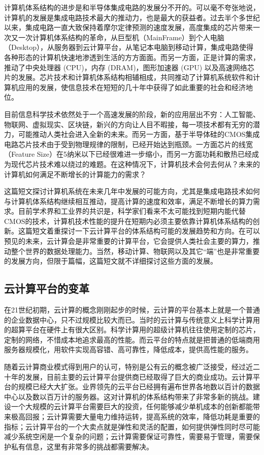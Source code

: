 计算机体系结构的进步是和半导体集成电路的发展分不开的。可以毫不夸张地说，计算机的发展是集成电路技术最大的推动力，也是最大的获益者。过去半个多世纪以来，集成电路一直大致保持着摩尔定律预测的速度发展，高度集成的芯片带来一次又一次计算机体系结构的革命，从巨型机（MainFrame）到个人电脑（Desktop），从服务器到云计算平台，从笔记本电脑到移动计算，集成电路使得各种形态的计算机快速地渗透到生活的方方面面。而另一方面，正是计算的需求，推动了中央处理器 (CPU)，内存 (DRAM)，图形加速器 (GPU) 以及高速网络芯片的发展。芯片技术和计算机体系结构相辅相成，共同推动了计算机系统软件和计算机应用的发展，使信息技术在短短的几十年中获得了如此重要的社会和经济地位。

目前信息科学技术依然处于一个高速发展的阶段，新的应用层出不穷：人工智能、物联网、虚拟现实、区块链，新兴的方向让人目不暇接，每一项技术都有无穷的潜力，可能推动人类社会进入全新的未来。而另一方面，基于半导体硅的CMOS集成电路芯片技术由于受到物理规律的限制，已经开始达到瓶颈。一方面芯片的线宽（Feature Size）在5纳米以下已经很难进一步缩小，而另一方面功耗和散热已经成为现代芯片技术难以绕过的难题。在这种情况下，计算机技术会何去何从？未来的计算机如何满足不断增长的计算能力的需求？

这篇短文探讨计算机系统在未来几年中发展的可能方向，尤其是集成电路技术如何与计算机体系结构继续相互推动，提高计算的速度和效率，满足不断增长的算力需求。目前学术界和工业界的共识是，科学家们看来不太可能找到短期内能代替CMOS的技术，计算机技术性能的提升在短期内必须主要依靠计算机体系结构的创新。这篇短文着重探讨一下云计算平台的体系结构可能的发展趋势和方向。在可以预见的未来，云计算会是非常重要的计算平台，它会提供人类社会主要的算力，推动整个世界的数据处理能力。当然，移动计算、物联网以及其它“端”也是非常重要的发展方向，但限于篇幅，这篇短文就不详细探讨这些方面的发展。

\subsection{云计算平台的变革}

在21世纪初期，云计算的概念刚刚起步的时候，云计算的平台基本上就是一个普通的企业数据中心，只不过规模比较大而已。当时的云计算与传统意义上科学计算用的超算平台在硬件上有很大区别。科学计算用的超级计算机往往使用定制的芯片，定制的网络，不惜成本地追求最高的性能。而云平台的特点就是把普通的低端商用服务器规模化，用软件实现高容错、高可靠性，降低成本，提供高性能的服务。

随着云计算商业模式得到用户的认可，特别是公有云的概念被广泛接受，经过近二十年的发展，目前主要的云计算平台提供商已经取得了巨大的商业成功。云计算平台的规模已经大大扩张。业界领先的云平台已经拥有遍布世界各地数以百计的数据中心以及数以百万计的服务器。这对计算机的体系结构带来了非常多新的挑战。建设一个大规模的云计算平台需要巨大的投资，任何能够减少单机成本的创新都能带来极高回报；云计算需要大量电力维持运转，提高系统的效率，降低功耗是重要的指标；云计算平台的一个大卖点就是弹性和灵活的配置，如何提供弹性同时尽可能减少系统空闲是一个复杂的问题；云计算需要保证可靠性，需要易于管理，需要保护私有信息，这里有非常多的挑战都需要解决。

